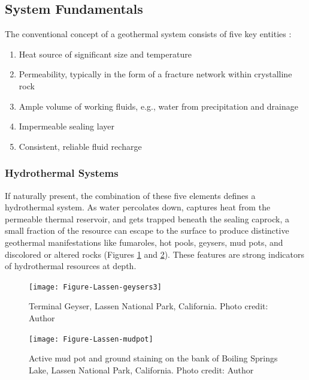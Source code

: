 \subsection{System Fundamentals}\label{ch2:sysfund}
The conventional concept of a geothermal system consists of five key entities \citep[p.\ 9]{dipippo_geothermal_2012}:
\renewcommand{\labelenumi}{\roman{enumi}}
\begin{enumerate}[itemsep=2pt] \label{list:sysreq}
   \item Heat source of significant size and temperature
   \item Permeability, typically in the form of a fracture network within crystalline rock
   \item Ample volume of working fluids, e.g., water from precipitation and drainage
   \item Impermeable sealing layer
   \item Consistent, reliable fluid recharge
\end{enumerate}

\subsubsection{Hydrothermal Systems}\label{ch2:hydro}
If naturally present, the combination of these five elements defines a hydrothermal system. As water percolates down, captures heat from the permeable thermal reservoir, and gets trapped beneath the sealing caprock, a small fraction of the resource can escape to the surface to produce distinctive geothermal manifestations like fumaroles, hot pools, geysers, mud pots, and discolored or altered rocks (Figures \ref{fig:lassen-geysers} and \ref{fig:lassen-mudpot}). These features are strong indicators of hydrothermal resources at depth.
\begin{figure}[h!]
\centering
\texttt{[image: Figure-Lassen-geysers3]}
\caption[Terminal Geyser, Lassen National Park]{Terminal Geyser, Lassen National Park, California. Photo credit: Author}
\label{fig:lassen-geysers}
\end{figure}
\begin{figure}[htbp]
\centering
\texttt{[image: Figure-Lassen-mudpot]}
\caption[Mud pot, Lassen National Park]{Active mud pot and ground staining on the bank of Boiling Springs Lake, Lassen National Park, California. Photo credit: Author}
\label{fig:lassen-mudpot}
\end{figure}

